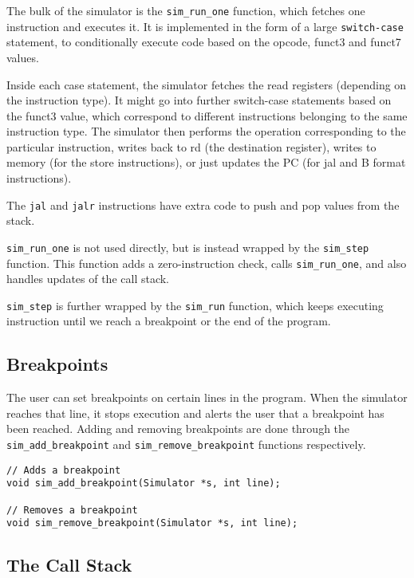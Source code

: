 \documentclass{article}
\begin{document}
The bulk of the simulator is the \texttt{sim\_run\_one} function,
which fetches one instruction and executes it. It is implemented
in the form of a large \texttt{switch-case} statement, to conditionally
execute code based on the opcode, funct3 and funct7 values.

Inside each case statement, the simulator fetches the read registers
(depending on the instruction type). It might go into further switch-case
statements based on the funct3 value, which correspond to different instructions
belonging to the same instruction type. The simulator then performs the operation
corresponding to the particular instruction, writes back to rd (the destination
register), writes to memory (for the store instructions), or just updates the PC
(for jal and B format instructions).

The \texttt{jal} and \texttt{jalr} instructions have extra code to push and pop
values from the stack.

\texttt{sim\_run\_one} is not used directly, but is instead wrapped by the \texttt{sim\_step}
function. This function adds a zero-instruction check, calls \texttt{sim\_run\_one}, and also
handles updates of the call stack.

\texttt{sim\_step} is further wrapped by the \texttt{sim\_run} function, which keeps executing
instruction until we reach a breakpoint or the end of the program.

\subsection{Breakpoints}

The user can set breakpoints on certain lines in the program. When the simulator reaches that line,
it stops execution and alerts the user that a breakpoint has been reached. Adding and removing
breakpoints are done through the \texttt{sim\_add\_breakpoint} and \texttt{sim\_remove\_breakpoint}
functions respectively.

\begin{verbatim}    
// Adds a breakpoint
void sim_add_breakpoint(Simulator *s, int line);

// Removes a breakpoint
void sim_remove_breakpoint(Simulator *s, int line);
\end{verbatim}

\subsection{The Call Stack}
\end{document}
